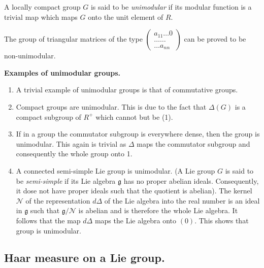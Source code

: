 \begin{defi*} %
 A locally compact group $G$ is said to be {\em unimodular} if its
 modular function is a trivial map which maps $G$ onto the unit
 element of $R$. 
\end{defi*}

The group of triangular matrices of the type
$
\left(
\begin{smallmatrix}
a_{11}\ldots 0\\
\ldots\ldots\\
\ldots a_{nn}
\end{smallmatrix}\right)
$
can be proved to be non-unimodular.

\medskip
\noindent
\textbf{Examples of unimodular groups.}
\begin{enumerate}
\renewcommand{\labelenumi}{(\theenumi)}
\item  A trivial example of unimodular groups is that of commutative
  groups. 

\item Compact groups are unimodular. This is due to the fact that
  $\Delta (G)$ is a compact subgroup of $R^+$ which cannot but be
  (1). 

\item If in a group the commutator subgroup is everywhere dense, then
  the group is unimodular. This again is trivial as $\Delta$ maps
  the commutator subgroup and consequently the whole group onto 1. 

\item  A connected semi-simple Lie group is unimodular. (A Lie group
  $G$ is said to be \textit{semi-simple} if its Lie algebra
  $\mathfrak{g}$ has no proper abelian ideals. Consequently, it dose
  not have proper ideals such that the quotient is abelian). The
  kernel $\mathscr{N}$ of the representation $d\Delta$ of the Lie algebra
  into the real number is an ideal in $\mathfrak{g}$ such that
  $\mathfrak{g}/\mathscr{N}$ is abelian and is therefore the whole Lie
  algebra. It follows that the map $d\Delta$ maps the Lie algebra
  onto $(0)$. This shows that group is unimodular. 
\end{enumerate}

\subsection{Haar measure on a Lie
  group.}\label{partII-chap3-sec3.2}\pageoriginale%

